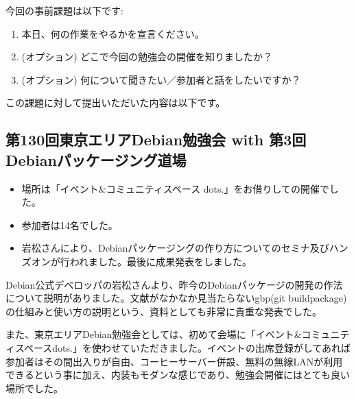\documentclass[mingoth,a4paper]{jsarticle}
\begin{document}

今回の事前課題は以下です:
\begin{enumerate}
\item 本日、何の作業をやるかを宣言ください。
\item (オプション) どこで今回の勉強会の開催を知りましたか？
\item (オプション) 何について聞きたい／参加者と話をしたいですか？
\end{enumerate}
この課題に対して提出いただいた内容は以下です。
\begin{multicols}{2}
{\small

}
\end{multicols}


\subsection{第130回東京エリアDebian勉強会 with 第3回 Debianパッケージング道場}

\begin{itemize}
\item 場所は「イベント\&コミュニティスペース dots.」をお借りしての開催でした。
\item 参加者は14名でした。
\item 岩松さんにより、Debianパッケージングの作り方についてのセミナ及びハンズオンが行われました。最後に成果発表をしました。
\end{itemize} 

 Debian公式デベロッパの岩松さんより、昨今のDebianパッケージの開発の作法について説明がありました。文献がなかなか見当たらないgbp(git buildpackage)の仕組みと使い方の説明という、資料としても非常に貴重な発表でした。

 また、東京エリアDebian勉強会としては、初めて会場に「イベント\&コミュニティスペースdots.」を使わせていただきました。イベントの出席登録がしてあれば参加者はその間出入りが自由、コーヒーサーバー併設、無料の無線LANが利用できるという事に加え、内装もモダンな感じであり、勉強会開催にはとても良い場所でした。 


\end{document}
